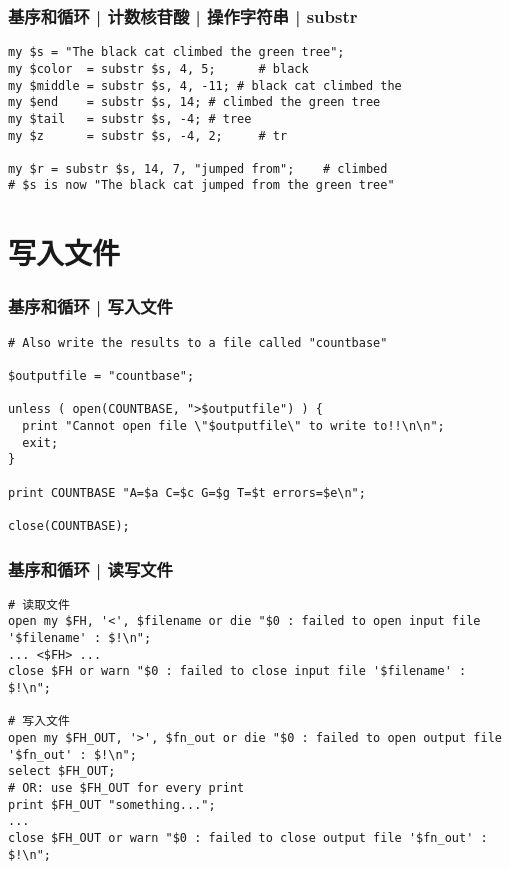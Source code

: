 \begin{frame}[fragile]
  \frametitle{基序和循环 | 计数核苷酸 | 操作字符串 | \alert{substr}}
\begin{lstlisting}
my $s = "The black cat climbed the green tree";
my $color  = substr $s, 4, 5;      # black
my $middle = substr $s, 4, -11; # black cat climbed the
my $end    = substr $s, 14; # climbed the green tree
my $tail   = substr $s, -4; # tree
my $z      = substr $s, -4, 2;     # tr

my $r = substr $s, 14, 7, "jumped from";    # climbed
# $s is now "The black cat jumped from the green tree"
\end{lstlisting}
\end{frame}

\section{写入文件}
\begin{frame}[fragile]
  \frametitle{基序和循环 | \alert{写入文件}}
\begin{lstlisting}
# Also write the results to a file called "countbase"

$outputfile = "countbase";

unless ( open(COUNTBASE, ">$outputfile") ) {
  print "Cannot open file \"$outputfile\" to write to!!\n\n";
  exit;
}

print COUNTBASE "A=$a C=$c G=$g T=$t errors=$e\n";

close(COUNTBASE);
\end{lstlisting}
\end{frame}

\begin{frame}[fragile]
  \frametitle{基序和循环 | \alert{读写文件}}
\begin{lstlisting}[basicstyle=\small\tt]
# 读取文件
open my $FH, '<', $filename or die "$0 : failed to open input file '$filename' : $!\n";
... <$FH> ...
close $FH or warn "$0 : failed to close input file '$filename' : $!\n";

# 写入文件
open my $FH_OUT, '>', $fn_out or die "$0 : failed to open output file '$fn_out' : $!\n";
select $FH_OUT;
# OR: use $FH_OUT for every print
print $FH_OUT "something...";
... 
close $FH_OUT or warn "$0 : failed to close output file '$fn_out' : $!\n";
\end{lstlisting}
\end{frame}

